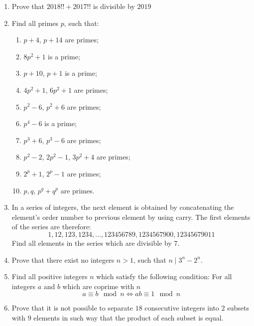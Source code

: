 \documentclass{article}
\begin{document}
\begin{enumerate}
	\item 
	Prove that $2018!! + 2017!!$ is divisible by $2019$
	
	\item 
	Find all primes $p$, such that:
	\begin{enumerate}
		\item  $p+4$, $p+14$ are primes;
		\item $8p^2+1$ is a prime;
		\item $p+10$, $p+1$ is a prime;
		\item $4p^2+1$, $6p^2+1$ are primes;
		\item $p^2-6$, $p^2+6$ are primes;
		\item $p^4-6$ is a prime;
		\item $p^3+6$, $p^3-6$ are primes;
		\item $p^2-2$, $2p^2-1$, $3p^2+4$ are primes;
		\item $2^p+1$, $2^p-1$ are primes;
		\item $p,q$, $p^q+q^p$ are primes.
	\end{enumerate}
	
	\item 
	In a series of integers, the next element is obtained by concatenating the element's order number to previous element by using carry. The first elements of the series are therefore:
	$${1,12,123,1234,\dots,123456789,1234567900,12345679011} $$
	Find all elements in the series which are divisible by $7$.
	
	\item %
	Prove that there exist no integers $n>1$, such that $n \mid 3^n-2^n$.
	
	\item 
	Find all positive integers $n$ which satisfy the following condition:
	For all integers $a$ and $b$ which are coprime with $n$
	$$ a \equiv b  \mod n \iff ab \equiv 1 \mod n$$

	\item
	Prove that it is not possible to separate $18$ consecutive integers into $2$ subsets with $9$ elements in such way that the product of each subset is equal.
\end{enumerate}
\end{document}
